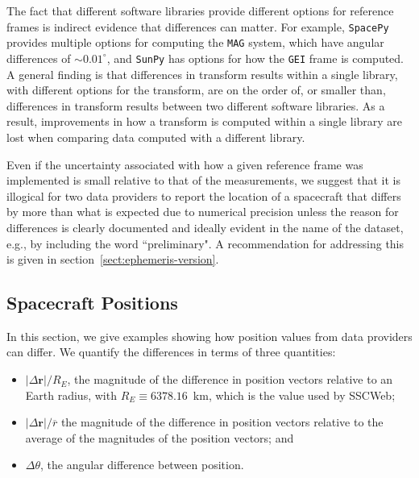 \documentclass[draft]{agujournal2019}
\begin{document}
The fact that different software libraries provide different options for reference frames is indirect evidence that differences can matter. For example, \texttt{SpacePy} \cite{SpacePy} provides multiple options for computing the \texttt{MAG} system, which have angular differences of ${\sim}0.01^\circ$, and \texttt{SunPy} \cite{SunPy} has options for how the \texttt{GEI} frame is computed. A general finding is that differences in transform results within a single library, with different options for the transform, are on the order of, or smaller than, differences in transform results between two different software libraries. As a result, improvements in how a transform is computed within a single library are lost when comparing data computed with a different library. 

Even if the uncertainty associated with how a given reference frame was implemented is small relative to that of the measurements, we suggest that it is illogical for two data providers to report the location of a spacecraft that differs by more than what is expected due to numerical precision unless the reason for differences is clearly documented and ideally evident in the name of the dataset, e.g., by including the word ``preliminary". A recommendation for addressing this is given in section~\ref{sect:ephemeris-version}.


\subsection{Spacecraft Positions}
\label{sect:comparisons_ephemeris}

In this section, we give examples showing how position values from data providers can differ. We quantify the differences in terms of three quantities: 

\begin{itemize}
    \item $|\Delta\mathbf{r}|/R_E$, the magnitude of the difference in position vectors relative to an Earth radius, with $R_E\equiv 6378.16$~km, which is the value used by SSCWeb;
    \item $|\Delta\mathbf{r}|/\overline{r}$ the magnitude of the difference in position vectors relative to the average of the magnitudes of the position vectors; and
    \item  $\Delta \theta$, the angular difference between position.
\end{itemize}
\end{document}
